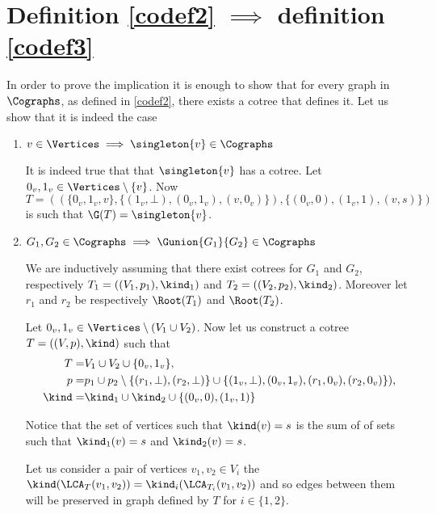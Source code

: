 \section{Definition \ref{codef2} $\implies$ definition \ref{codef3}}

In order to prove the implication it is enough to show that for every graph in $\Cographs$, as defined in \ref{codef2}, there exists a cotree that defines it. Let us show that it is indeed the case

\begin{enumerate}
    \item $v \in \Vertices \implies \singleton{v} \in \Cographs$

          It is indeed true that that $\singleton{v}$ has a cotree. Let $0_v, 1_v \in \Vertices \setminus \{v\}$. Now
          \[
              T = ((\{0_v,1_v,v\}, \{(1_v,\bot), (0_v,1_v),(v,0_v)\}), \{(0_v,0), (1_v,1), (v,s)\})
          \]
          is such that $\G(T) = \singleton{v}$.

    \item $G_1,G_2 \in \Cographs \implies \Gunion{G_1}{G_2} \in \Cographs$

          We are inductively assuming that there exist cotrees for $G_1$ and $G_2$, respectively $T_1 = ((V_1, p_1), \kind_1)$ and $T_2 = ((V_2, p_2), \kind_2)$. Moreover let $r_1$ and $r_2$ be respectively $\Root(T_1)$ and $\Root(T_2)$.

          Let $0_v, 1_v \in \Vertices \setminus (V_1 \cup V_2)$. Now let us construct a cotree $T = ((V, p), \kind)$ such that
          \[
              \begin{split}
                  T = & V_1\cup V_2 \cup \{0_v,1_v\}, \\
                  p = & p_1 \cup p_2 \setminus \{(r_1,\bot), (r_2, \bot)\} \cup \{(1_v, \bot), (0_v, 1_v), (r_1, 0_v), (r_2, 0_v)\}
                  ), \\
                  \kind = & \kind_1 \cup \kind_2 \cup \{(0_v,0), (1_v,1)\}
              \end{split}
          \]

          Notice that the set of vertices such that $\kind(v) = s$ is the sum of of sets such that $\kind_1(v) = s$ and $\kind_2(v) = s$.

          Let us consider a pair of vertices $v_1, v_2 \in V_i$ the $\kind(\LCA_T(v_1, v_2)) = \kind_{i}(\LCA_{T_{i}}(v_1, v_2))$ and so edges between them will be preserved in graph defined by $T$ for $i \in \{1,2\}$.


\end{enumerate}
